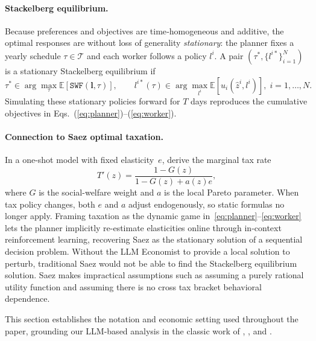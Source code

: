 
\paragraph{Stackelberg equilibrium.}
Because preferences and objectives are time‑homogeneous and additive, the optimal responses are without loss of generality \emph{stationary}: the planner fixes a yearly schedule $\tau\!\in\!\mathcal{T}$ and each worker follows a policy $l^{i}$.  A pair $(\tau^{*},\{l^{i*}\}_{i=1}^{N})$ is a stationary Stackelberg equilibrium if
\[
\tau^{*}\in\arg\max_{\tau}
      \mathbb{E}[\texttt{SWF}(\mathbf{l},\tau)],\qquad
l^{i*}(\tau)\in\arg\max_{l^i}
      \mathbb{E}[u_{i}(\hat z^{i},l^{i})],\; i=1,\dots,N.
\]
Simulating these stationary policies forward for $T$ days reproduces the cumulative objectives in Eqs.~(\ref{eq:planner})–(\ref{eq:worker}).


\paragraph{Connection to Saez optimal taxation.}
In a one-shot model with fixed elasticity~$e$, \citet{saez2001using} derive the marginal tax rate  
\[
T'(z)=\frac{1-G(z)}{1-G(z)+a(z)e},
\]
where $G$ is the social-welfare weight and $a$ is the local Pareto parameter.  
When tax policy changes, both $e$ and $a$ adjust endogenously, so static formulas no longer apply.  
Framing taxation as the dynamic game in~\eqref{eq:planner}–\eqref{eq:worker} lets the planner implicitly re-estimate elasticities online through in-context reinforcement learning, recovering Saez as the stationary solution of a sequential decision problem. 
Without the LLM Economist to provide a local solution to perturb, traditional Saez would not be able to find the Stackelberg equilibrium solution. Saez makes impractical assumptions such as assuming a purely rational utility function and assuming there is no cross tax bracket behavioral dependence.

This section establishes the notation and economic setting used throughout the paper, grounding our LLM-based analysis in the classic work of \citet{diamond1971optimal}, \citet{mirrlees1976optimal}, and \citet{mankiw2009optimal}.
